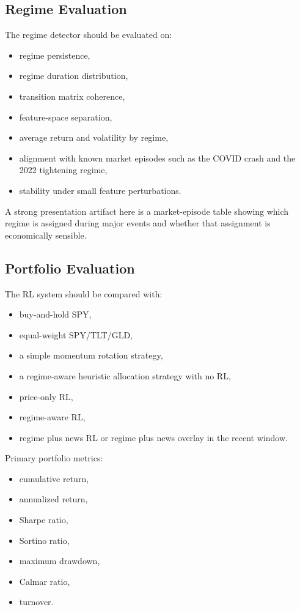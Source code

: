 \documentclass[11pt,a4paper]{article}
\begin{document}
\subsection{Regime Evaluation}

The regime detector should be evaluated on:

\begin{itemize}[leftmargin=1.4em]
  \item regime persistence,
  \item regime duration distribution,
  \item transition matrix coherence,
  \item feature-space separation,
  \item average return and volatility by regime,
  \item alignment with known market episodes such as the COVID crash and the 2022 tightening regime,
  \item stability under small feature perturbations.
\end{itemize}

A strong presentation artifact here is a market-episode table showing which regime is assigned during major events and whether that assignment is economically sensible.

\subsection{Portfolio Evaluation}

The RL system should be compared with:

\begin{itemize}[leftmargin=1.4em]
  \item buy-and-hold SPY,
  \item equal-weight SPY/TLT/GLD,
  \item a simple momentum rotation strategy,
  \item a regime-aware heuristic allocation strategy with no RL,
  \item price-only RL,
  \item regime-aware RL,
  \item regime plus news RL or regime plus news overlay in the recent window.
\end{itemize}

Primary portfolio metrics:

\begin{itemize}[leftmargin=1.4em]
  \item cumulative return,
  \item annualized return,
  \item Sharpe ratio,
  \item Sortino ratio,
  \item maximum drawdown,
  \item Calmar ratio,
  \item turnover.
\end{itemize}
\end{document}
